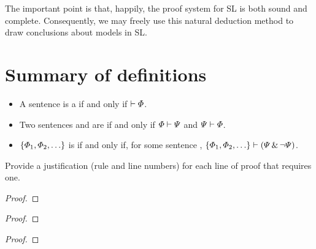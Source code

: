 The important point is that, happily, the proof system for SL is both sound and complete. Consequently, we may freely use this natural deduction method to draw conclusions about models in SL.


\section*{Summary of definitions}
\begin{itemize}
\item A sentence \metaA{} is a  if and only if $\vdash\varPhi{}$.

\item Two sentences \metaA{} and \metaB{} are  if and only if $\varPhi{}\vdash\varPsi{}$ and $\varPsi{}\vdash\varPhi{}$.

\item $\{\varPhi{}_1,\varPhi{}_2,\ldots\}$ is  if and only if, for some sentence \metaB{}, $\{\varPhi{}_1,\varPhi{}_2,\ldots\}\vdash(\varPsi{} \,\&\, \neg \varPsi{})$.
\end{itemize}



\practiceproblems

\solutions
\problempart
\label{pr.justifySLproof}
Provide a justification (rule and line numbers) for each line of proof that requires one.
\begin{multicols}{2}
\begin{proof}
 {}
 {}
\end{proof}

\begin{proof}
\open
\close
{}
\end{proof}

\begin{proof}
\open
	 {}
	\open
	\close
\close
{}
\end{proof}
\end{multicols}


